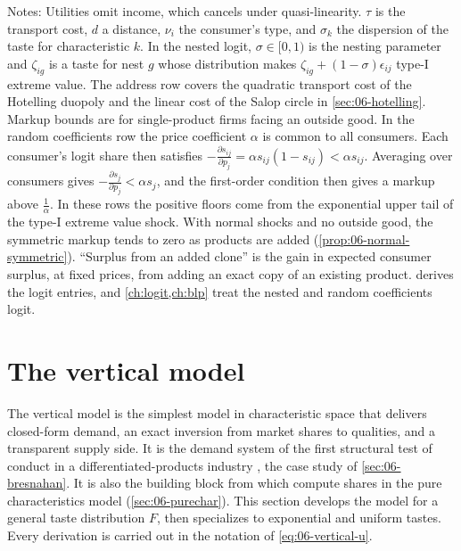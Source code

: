 \begin{table}[htbp]
\begin{tabularx}{\textwidth}
\bottomrule
\end{tabularx}
\par\smallskip
\begin{minipage}{\textwidth}
\footnotesize Notes: Utilities omit income, which cancels under quasi-linearity. $\tau$ is the transport cost,
$d$ a distance, $\nu_i$ the consumer's type, and $\sigma_k$ the dispersion of the taste for characteristic
$k$. In the nested logit, $\sigma \in [0,1)$ is the nesting parameter and $\zeta_{ig}$ is a taste for nest $g$
whose distribution makes $\zeta_{ig} + (1-\sigma)\epsilon_{ij}$ type-I extreme value. The address row covers the
quadratic transport cost of the Hotelling duopoly and the linear cost of the Salop circle in \cref{sec:06-hotelling}.
Markup bounds are for single-product firms facing an outside good. In the random coefficients row the price
coefficient $\alpha$ is common to all consumers. Each consumer's logit share then satisfies
$-\frac{\partial s_{ij}}{\partial p_j} = \alpha s_{ij}(1 - s_{ij}) < \alpha s_{ij}$. Averaging over consumers gives
$-\frac{\partial s_j}{\partial p_j} < \alpha s_j$, and the first-order condition then gives a markup above $\frac{1}{\alpha}$. In these rows the positive floors come from the exponential upper tail of the type-I extreme value shock. With normal shocks and no outside good, the symmetric markup
tends to zero as products are added (\cref{prop:06-normal-symmetric}). ``Surplus from an added clone'' is the gain in expected consumer surplus,
at fixed prices, from adding an exact copy of an existing product.  derives the logit
entries, and \cref{ch:logit,ch:blp} treat the nested and random coefficients logit.
\end{minipage}
\end{table}

\section{The vertical model}\label{sec:06-vertical}

The vertical model is the simplest model in characteristic space that delivers closed-form demand, an
exact inversion from market shares to qualities, and a transparent supply side. It is the demand system of
the first structural test of conduct in a differentiated-products industry \citep{Bresnahan1987}, the
case study of \cref{sec:06-bresnahan}. It is also the building block from which \citet{BerryPakes2007}
compute shares in the pure characteristics model (\cref{sec:06-purechar}). This section develops the
model for a general taste distribution $F$, then specializes to exponential and uniform tastes. Every
derivation is carried out in the notation of \eqref{eq:06-vertical-u}.


